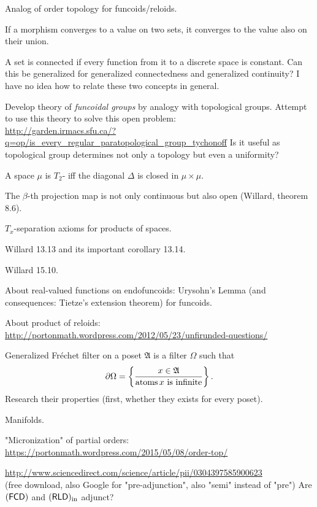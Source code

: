 \documentclass{amsart}
\begin{document}
Analog of order topology for funcoids/reloids.

If a morphism converges to a value on two sets, it converges to the value also on their union.

A set is connected if every function from it to a discrete space is constant. Can this be generalized for generalized connectedness and generalized continuity? I have no idea how to relate these two concepts in general.

Develop theory of \emph{funcoidal groups} by analogy with topological groups.
Attempt to use this theory to solve this open problem:\\
\url{http://garden.irmacs.sfu.ca/?q=op/is_every_regular_paratopological_group_tychonoff}
Is it useful as topological group determines not only a topology but even a uniformity?

A space $\mu$ is $T_2$- iff the diagonal $\Delta$ is closed in $\mu\times\mu$.

The $\beta$-th projection map is not only continuous but also open (Willard, theorem 8.6).

$T_x$-separation axioms for products of spaces.

Willard 13.13 and its important corollary 13.14.

Willard 15.10.

About real-valued functions on endofuncoids: Urysohn's Lemma (and consequences: Tietze's extension theorem) for funcoids.

About product of reloids:\\
\url{http://portonmath.wordpress.com/2012/05/23/unfirunded-questions/}

Generalized Fr\'echet filter on a poset $\mathfrak{A}$ is a filter $\Omega$ such that
\[ \partial\Omega = \left\{ \frac{x\in\mathfrak{A}}{\operatorname{atoms} x\text{ is infinite}}\right\}. \]
Research their properties (first, whether they exists for every poset).

Manifolds.

"Micronization" of partial orders:\\
\url{https://portonmath.wordpress.com/2015/05/08/order-top/}

\url{http://www.sciencedirect.com/science/article/pii/0304397585900623}\\
(free download, also Google for "pre-adjunction", also "semi" instead of "pre") Are $(\mathsf{FCD})$ and $(\mathsf{RLD})_{\mathrm{in}}$ adjunct?
\end{document}
